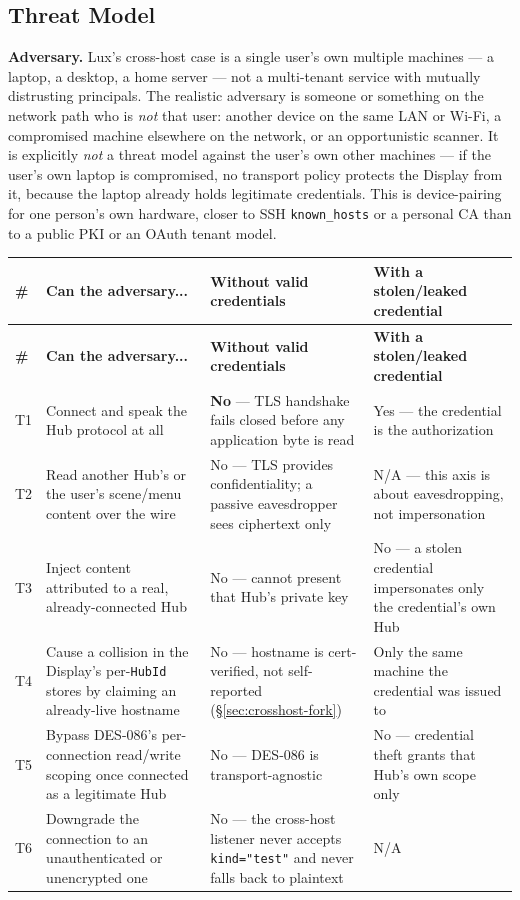 \documentclass[a4paper,10pt]{article}
\begin{document}
\subsection{Threat Model}

\textbf{Adversary.}  Lux's cross-host case is a single user's own multiple
machines --- a laptop, a desktop, a home server --- not a multi-tenant
service with mutually distrusting principals.  The realistic adversary is
someone or something on the network path who is \emph{not} that user:
another device on the same LAN or Wi-Fi, a compromised machine elsewhere on
the network, or an opportunistic scanner.  It is explicitly \emph{not} a
threat model against the user's own other machines --- if the user's own
laptop is compromised, no transport policy protects the Display from it,
because the laptop already holds legitimate credentials.  This is
device-pairing for one person's own hardware, closer to SSH
\texttt{known\_hosts} or a personal CA than to a public PKI or an OAuth
tenant model.

\begin{longtable}{p{0.5cm}p{4.0cm}p{4.4cm}p{4.4cm}}
\toprule
\textbf{\#} & \textbf{Can the adversary...} & \textbf{Without valid credentials} & \textbf{With a stolen/leaked credential} \\
\midrule
\endfirsthead
\toprule
\textbf{\#} & \textbf{Can the adversary...} & \textbf{Without valid credentials} & \textbf{With a stolen/leaked credential} \\
\midrule
\endhead
T1 & Connect and speak the Hub protocol at all & \textbf{No} --- TLS
  handshake fails closed before any application byte is read & Yes ---
  the credential is the authorization \\
T2 & Read another Hub's or the user's scene/menu content over the wire &
  No --- TLS provides confidentiality; a passive eavesdropper sees
  ciphertext only & N/A --- this axis is about eavesdropping, not
  impersonation \\
T3 & Inject content attributed to a real, already-connected Hub & No ---
  cannot present that Hub's private key & No --- a stolen credential
  impersonates only the credential's own Hub \\
T4 & Cause a collision in the Display's per-\texttt{HubId} stores by
  claiming an already-live hostname & No --- hostname is cert-verified,
  not self-reported (\S\ref{sec:crosshost-fork}) & Only the same machine
  the credential was issued to \\
T5 & Bypass DES-086's per-connection read/write scoping once connected as
  a legitimate Hub & No --- DES-086 is transport-agnostic & No ---
  credential theft grants that Hub's own scope only \\
T6 & Downgrade the connection to an unauthenticated or unencrypted one &
  No --- the cross-host listener never accepts \texttt{kind="test"} and
  never falls back to plaintext & N/A \\
\bottomrule
\end{longtable}
\end{document}
